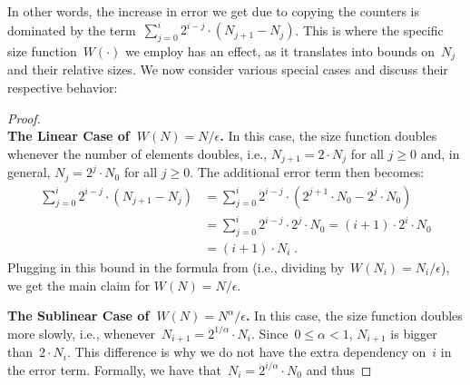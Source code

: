 \documentclass[sigconf]{acmart}
\begin{document}
In other words, the increase in error we get due to copying the counters is
dominated by the term~$\sum_{j=0}^i  2^{i-j} \cdot (N_{j+1} - N_j)$. This is
where the specific size function~$W(\cdot)$ we employ has an effect, as it
translates into bounds on~$N_j$ and their relative sizes. We now consider
various special cases and discuss their respective behavior:
\thmcms*
\begin{proof} ‌\\
    \textbf{The Linear Case of~$W(N)=N/\epsilon$.}
    In this case, the size function doubles whenever the number of elements
    doubles, i.e., $N_{j+1} = 2 \cdot N_j$ for all $j\geq 0$ and, in general,
    $N_j = 2^j \cdot N_0$ for all $j\geq 0$. The additional error term then
    becomes:
	\begin{align*}
		\sum_{j=0}^i  2^{i-j} \cdot  (N_{j+1} - N_j) & =	\sum_{j=0}^i  2^{i-j} \cdot  (2^{j+1}\cdot N_0 - 2^{j}\cdot N_0)\\
		&=  \sum_{j=0}^i  2^{i-j} \cdot  2^j \cdot N_0 = (i+1) \cdot 2^i \cdot N_0\\
		&= (i+1) \cdot N_i\;.
	\end{align*}	
    Plugging in this bound in the formula from  (i.e.,
    dividing by~$W(N_i)=N_i/\epsilon$), we get the main claim for
    $W(N)=N/\epsilon$. 
	
	
	\medskip\noindent
    \textbf{The Sublinear Case of~$W(N)=N^{\alpha}/\epsilon$.}
    In this case, the size function doubles more slowly, i.e.,
    whenever~$N_{i+1} = 2^{1/\alpha} \cdot N_i$. Since~$0 \leq \alpha < 1$,
    $N_{i+1}$ is bigger than~$2\cdot N_i$. This difference is why we do not
    have the extra dependency on~$i$ in the error term. Formally, we have
    that~$N_i = 2^{i/\alpha} \cdot N_0$ and thus


\end{proof}
\end{document}
